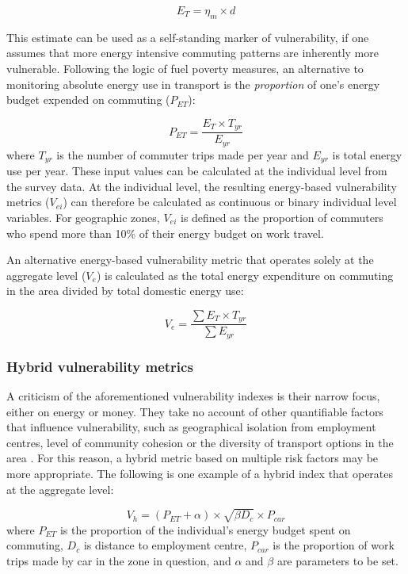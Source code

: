 \documentclass[a4paper, 11pt, twoside]{Thesis}
\begin{document}
\begin{equation}
 E_T = \eta_m \times d
\label{e:e}
\end{equation}

This estimate can be used as a self-standing marker of vulnerability, if one
assumes that more energy intensive commuting patterns are
inherently more vulnerable. Following the logic of fuel poverty measures,
an alternative to monitoring absolute energy use in transport is
 the \emph{proportion} of one's energy budget expended on commuting ($P_{ET}$):

\begin{equation}
P_{ET} = \frac{E_T \times T_{yr}}{E_{yr}}
\label{e:pet}
\end{equation}
where $T_{yr}$ is the number of commuter trips made per year and $E_{yr}$ is
total energy use per year. These input values can be calculated at the
individual level from the survey data.
At the individual level, the resulting energy-based vulnerability metrics
($V_{ei}$) can therefore be calculated as continuous or binary individual level
variables. For geographic zones, $V_{ei}$ is defined as the proportion of
commuters who spend more than 10\% of their energy budget on work travel.

An alternative energy-based vulnerability metric that operates solely at the
aggregate level ($V_e$) is calculated as the total energy expenditure on
commuting in the area divided by total domestic energy use:

\begin{equation}
 V_e = \frac{ \sum E_T \times T_{yr}} {\sum E_{yr}}
\end{equation}

\subsubsection{Hybrid vulnerability metrics}
A criticism of the aforementioned vulnerability indexes is their narrow focus,
either on energy or money. They take no account of other quantifiable factors
that influence vulnerability, such as geographical isolation from employment
centres, level of community cohesion or the diversity of transport
options in the area \citep{Pickerill2008,
North2010585, Steele2010mind, newman2009resilient}.
For this reason, a hybrid metric based on multiple risk
factors may be more appropriate. The following is one example of a hybrid
index that operates at the aggregate level:

\begin{equation}
 V_h = (P_{ET} + \alpha) \times \sqrt{\beta D_{c}} \times P_{car}
\label{e:ev}
\end{equation}
where $P_{ET}$ is the proportion of the individual's energy budget spent on
commuting, $D_{c}$ is distance to employment centre, $P_{car}$ is the proportion
of work trips made by car in the zone in question, and $\alpha$ and $\beta$ are
parameters to be set.
\end{document}
